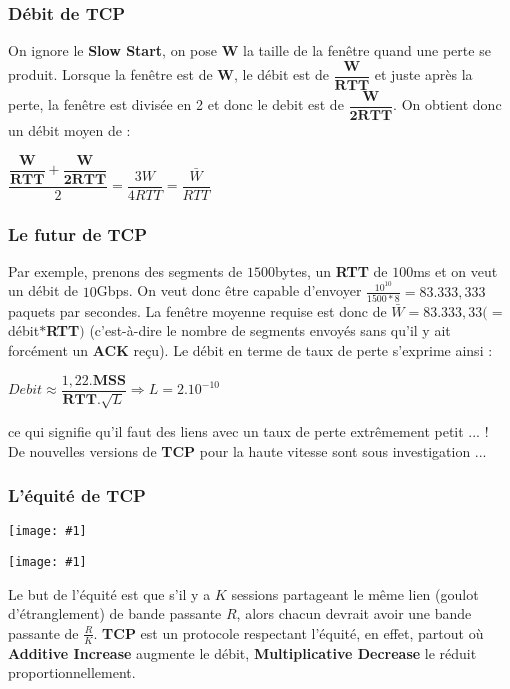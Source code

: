 \documentclass{article}
\newcommand{\imgR}[2]{\begin{center}\texttt{[image: \#1]}\end{center}}
\begin{document}
\subsubsection{Débit de TCP}

On ignore le \textbf{Slow Start}, on pose \textbf{W} la taille de la fenêtre quand une perte se produit. Lorsque
la fenêtre est de \textbf{W}, le débit est de $\dfrac{\mathbf{W}}{\mathbf{RTT}}$ et juste après la perte, la 
fenêtre est divisée en 2 et donc le debit est de $\dfrac{\mathbf{W}}{\mathbf{2RTT}}$. On obtient donc un débit 
moyen de : \\
\begin{center}
$\dfrac{ \dfrac{\mathbf{W}}{\mathbf{RTT}} + \dfrac{\mathbf{W}}{\mathbf{2RTT}}} {2} = \boxed{ \dfrac{3W}{4RTT} = 
\dfrac{\bar{W}}{RTT}}$
\end{center}

\subsubsection*{Le futur de TCP}

Par exemple, prenons des segments de $1500$bytes, un \textbf{RTT} de $100$ms et on veut un débit de $10$Gbps.
On veut donc être capable d'envoyer $\frac{10^{10}}{1500*8} = 83.333,333$ paquets par secondes. La fenêtre 
moyenne requise est donc de $\bar{W} = 83.333,33 (=$ débit$*$\textbf{RTT}$)$ (c'est-à-dire le nombre de segments 
envoyés sans qu'il y ait forcément un \textbf{ACK} reçu). Le débit en terme de taux de perte s'exprime ainsi : 
\begin{center}
$Debit \approx \dfrac{1,22.\mathbf{MSS}}{\mathbf{RTT}.\sqrt{L}} \Rightarrow L = 2.10^{-10}$
\end{center}
ce qui signifie qu'il faut des liens avec un taux de perte extrêmement petit ... !\\
De nouvelles versions de \textbf{TCP} pour la haute vitesse sont sous investigation ...

\subsubsection{L'équité de TCP}

\imgR{CN_067.png}{200}

\begin{multicols}{2}
\imgR{CN_068.png}{200}
Le but de l'équité est que s'il y a $K$ sessions partageant le même lien (goulot d'étranglement) de bande 
passante $R$, alors chacun devrait avoir une bande passante de $\frac{R}{K}$. \textbf{TCP} est un protocole
respectant l'équité, en effet, partout où \textbf{Additive Increase} augmente le débit, \textbf{Multiplicative 
Decrease} le réduit proportionnellement.
\end{multicols}
\end{document}
